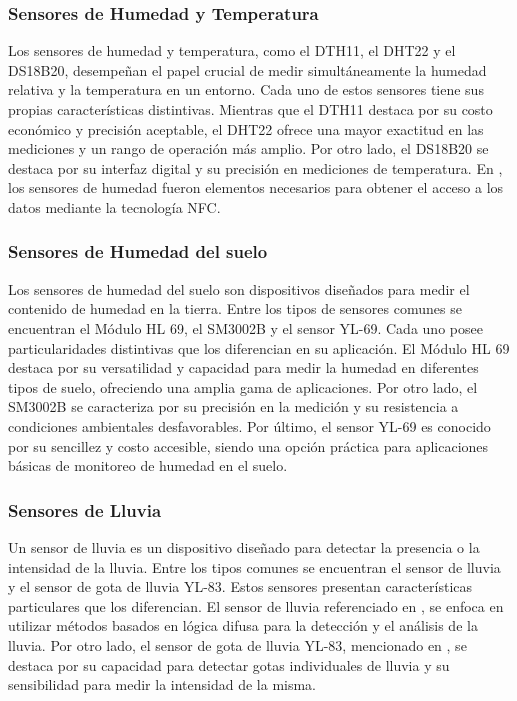 \subsubsection*{Sensores de Humedad y Temperatura}
Los sensores de humedad y temperatura, como el DTH11, el DHT22 y el DS18B20, desempeñan el papel crucial de medir simultáneamente la humedad relativa y la temperatura en un entorno. Cada uno de estos sensores tiene sus propias características distintivas. Mientras que el DTH11 destaca por su costo económico y precisión aceptable, el DHT22 ofrece una mayor exactitud en las mediciones y un rango de operación más amplio. Por otro lado, el DS18B20 se destaca por su interfaz digital y su precisión en mediciones de temperatura. En \cite{castillo_herrero_desarrollo_2020}, los sensores de humedad fueron elementos necesarios para obtener el acceso a los datos mediante la tecnología NFC.

\subsubsection*{Sensores de Humedad del suelo}
Los sensores de humedad del suelo son dispositivos diseñados para medir el contenido de humedad en la tierra. Entre los tipos de sensores comunes se encuentran el Módulo HL 69, el SM3002B y el sensor YL-69. Cada uno posee particularidades distintivas que los diferencian en su aplicación. El Módulo HL 69 destaca por su versatilidad y capacidad para medir la humedad en diferentes tipos de suelo, ofreciendo una amplia gama de aplicaciones. Por otro lado, el SM3002B se caracteriza por su precisión en la medición y su resistencia a condiciones ambientales desfavorables. Por último, el sensor YL-69 es conocido por su sencillez y costo accesible, siendo una opción práctica para aplicaciones básicas de monitoreo de humedad en el suelo.

\subsubsection*{Sensores de Lluvia}
Un sensor de lluvia es un dispositivo diseñado para detectar la presencia o la intensidad de la lluvia. Entre los tipos comunes se encuentran el sensor de lluvia y el sensor de gota de lluvia YL-83. Estos sensores presentan características particulares que los diferencian. El sensor de lluvia referenciado en \cite{krishnan_fuzzy_2020}, se enfoca en utilizar métodos basados en lógica difusa para la detección y el análisis de la lluvia. Por otro lado, el sensor de gota de lluvia YL-83, mencionado en \cite{alcivar_dominguez_sistema_2018}, se destaca por su capacidad para detectar gotas individuales de lluvia y su sensibilidad para medir la intensidad de la misma.

